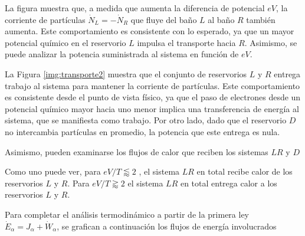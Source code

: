 
La figura muestra que, a medida que aumenta la diferencia de potencial \( eV \), la corriente de partículas \( \dot{N}_L = -\dot{N}_R \) que fluye del baño \( L \) al baño \( R \) también aumenta. Este comportamiento es consistente con lo esperado, ya que un mayor potencial químico en el reservorio \( L \) impulsa el transporte hacia \( R \). Asimismo, se puede analizar la potencia suministrada al sistema en función de \( eV \).

    
La Figura \ref{img:transporte2} muestra que el conjunto de reservorios \( L \) y \( R \) entrega trabajo al sistema para mantener la corriente de partículas. Este comportamiento es consistente desde el punto de vista físico, ya que el paso de electrones desde un potencial químico mayor hacia uno menor implica una transferencia de energía al sistema, que se manifiesta como trabajo. Por otro lado, dado que el reservorio \( D \) no intercambia partículas en promedio, la potencia que este entrega es nula.

 Asimismo, pueden examinarse los flujos de calor que reciben los sistemas $LR$ y $D$


    
Como uno puede ver, para $eV/T \lessapprox 2$ , el sistema $LR$ en total recibe calor de los reservorios $L$ y $R$. Para $eV/T \gtrapprox 2$ el sistema $LR$ en total entrega calor a los reservorios $L$ y $R$. 

Para completar el análisis termodinámico a partir de la primera ley $\dot{E}_{\alpha} = J_{\alpha} + \dot{W}_{\alpha}$, se grafican a continuación los flujos de energía involucrados



